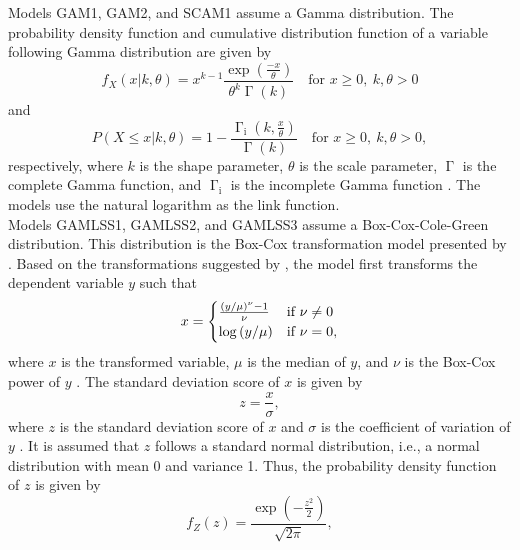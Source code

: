 Models GAM1, GAM2, and SCAM1 assume a Gamma distribution.  The probability density function and cumulative distribution function of a variable following Gamma distribution are given by
\begin{equation}
  \label{eq:GammaDistributionPDF}
  f_X(x|k, \theta) = x^{k - 1} \frac{\exp{\left(\frac{-x}{\theta}\right)}}{\theta^k \upGamma(k)} \quad \text{for } x \geq 0, ~ k, \theta > 0
\end{equation}
and
\begin{equation}
  \label{eq:GammaDistributionCDF}
    P(X \leq x|k, \theta) = 1 - \frac{\upGamma_{\text{i}}\left(k, \frac{x}{\theta}\right)}{\upGamma(k)} \quad \text{for } x \geq 0, ~ k, \theta > 0,
\end{equation}
respectively, where \(k\) is the shape parameter, \(\theta\) is the scale parameter, \(\upGamma\) is the complete Gamma function, and \(\upGamma_{\text{i}}\) is the incomplete Gamma function \parencite{Weisstein2017b,Dormann2013,Lindgren1976}.  The models use the natural logarithm as the link function.  \\
Models GAMLSS1, GAMLSS2, and GAMLSS3 assume a Box-Cox-Cole-Green distribution. This distribution is the Box-Cox transformation model presented by \textcite{Cole1992} \parencite{Stasinopoulos2007}.  Based on the transformations suggested by \textcite{Box1964}, the model first transforms the dependent variable \(y\) such that
\begin{equation}
  \label{eq:BoxCoxColeGreenTransformation}
  x =
  \begin{cases}
    \frac{\left(
        y \middle/ \mu
      \right)^\nu - 1}{\nu} &\text{if } \nu \not = 0 \\
    \log\left(y \middle/ \mu\right) &\text{if } \nu = 0,
  \end{cases}
\end{equation}
where \(x\) is the transformed variable, \(\mu\) is the median of \(y\), and \(\nu\) is the Box-Cox power of \(y\) \parencite{Cole1992}.
The standard deviation score of \(x\) is given by
\begin{equation}
  \label{eq:BoxCoxColeGreenSDScore}
  z = \frac{x}{\sigma},
\end{equation}
where \(z\) is the standard deviation score of \(x\) and \(\sigma\) is the coefficient of variation of \(y\) .  It is assumed that \(z\) follows a standard normal distribution, i.e., a normal distribution with mean 0 and variance 1. Thus, the probability density function of \(z\) is given by
\begin{equation}
  \label{eq:StandardNormalDistributionPDF}
  f_Z(z) =
  \frac{\exp{\left(-\frac{z^2}{2}\right)}}{\sqrt{2 \pi}},
\end{equation}

